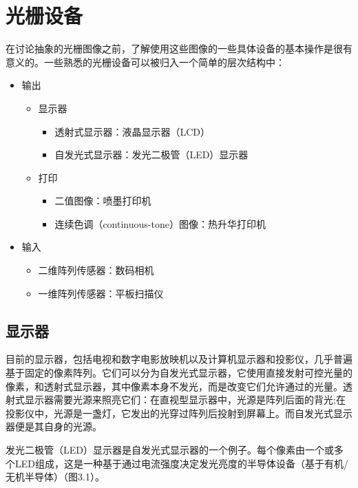 \documentclass[lang=cn,12pt]{elegantbook}
\begin{document}

\section{光栅设备}

 在讨论抽象的光栅图像之前，了解使用这些图像的一些具体设备的基本操作是很有意义的。一些熟悉的光栅设备可以被归入一个简单的层次结构中：

\begin{itemize}
  \item 输出
\begin{itemize}
  \item 显示器
\begin{itemize}
  \item 透射式显示器：液晶显示器（LCD）
  \item 自发光式显示器：发光二极管（LED）显示器
\end{itemize}
  \item 打印
\begin{itemize}
  \item 二值图像：喷墨打印机
  \item 连续色调（continuous-tone）图像：热升华打印机
\end{itemize}
\end{itemize}
  \item 输入
\begin{itemize}
  \item 二维阵列传感器：数码相机
  \item 一维阵列传感器：平板扫描仪
\end{itemize}
\end{itemize}

\subsection{显示器}

目前的显示器，包括电视和数字电影放映机以及计算机显示器和投影仪，几乎普遍基于固定的像素阵列。它们可以分为自发光式显示器，它使用直接发射可控光量的像素，和透射式显示器，其中像素本身不发光，而是改变它们允许通过的光量。透射式显示器需要光源来照亮它们：在直视型显示器中，光源是阵列后面的背光;在投影仪中，光源是一盏灯，它发出的光穿过阵列后投射到屏幕上。而自发光式显示器便是其自身的光源。

发光二极管（LED）显示器是自发光式显示器的一个例子。每个像素由一个或多个LED组成，这是一种基于通过电流强度决定发光亮度的半导体设备（基于有机/无机半导体）（图3.1）。
\end{document}
